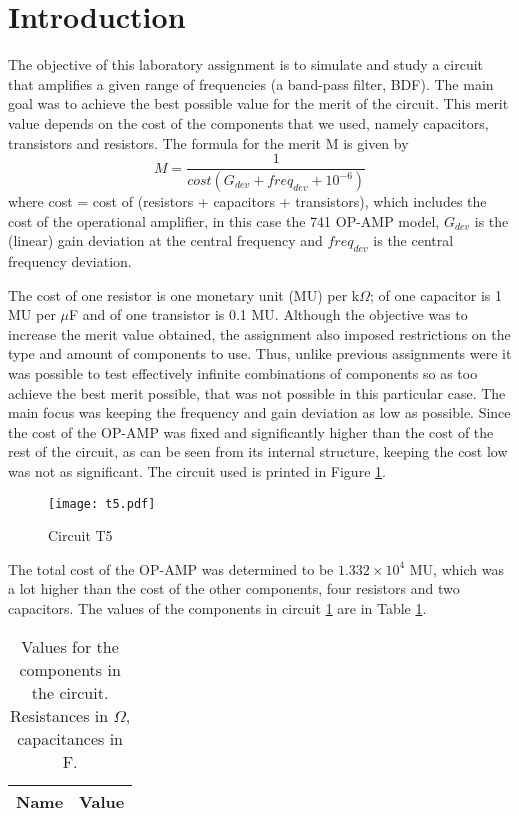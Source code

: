 \section{Introduction}
\label{sec:introduction}

The objective of this laboratory assignment is to simulate and study a circuit that amplifies a given range of frequencies (a band-pass filter, BDF). The main goal was to achieve the best possible value for the merit of the circuit. This merit value depends on the cost of the components that we used, namely capacitors, transistors and resistors. The formula for the merit M is given by 
\begin{equation}
   M= \frac{1}{cost (G_{dev} + freq_{dev} + 10^{-6})}
\end{equation}
where cost = cost of (resistors + capacitors + transistors), which includes the cost of the operational amplifier, in this case the 741 OP-AMP model, $G_{dev}$ is the (linear) gain deviation at the central frequency and $freq_{dev}$ is the central frequency deviation.


The cost of one resistor is one monetary unit (MU) per k$\Omega$; of one capacitor is 1 MU per $\mu$F and of one transistor is 0.1 MU. Although the objective was to increase the merit value obtained, the assignment also imposed restrictions on the type and amount of components to use. Thus, unlike previous assignments were it was possible to test effectively infinite combinations of components so as too achieve the best merit possible, that was not possible in this particular case. The main focus was keeping the frequency and gain deviation as low as possible. Since the cost of the OP-AMP was fixed and significantly higher than the cost of the rest of the circuit, as can be seen from its internal structure, keeping the cost low was not as significant. The circuit used is printed in Figure \ref{circuit}.

\begin{figure}[H] \centering
\texttt{[image: t5.pdf]} 
\caption{Circuit T5}
\label{circuit}
\end{figure}

The total cost of the OP-AMP was determined to be $1.332\times 10^4$ MU, which was a lot higher than the cost of the other components, four resistors and two capacitors. The values of the components in circuit \ref{circuit} are in Table \ref{tab_valores}.
\begin{table}[H]
\centering
    \begin{tabular}{c|c}        %
\hline                      %

\textbf{Name}  & \textbf{Value}\\     
\hline                      %

\hline                      %
\end{tabular}
    \caption{Values for the components in the circuit. Resistances in $\Omega$, capacitances in F.}
 \label{tab_valores}
\end{table}  

